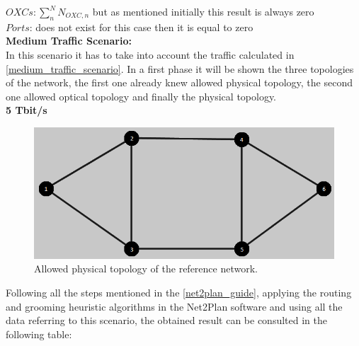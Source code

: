 \vspace{13pt}
$OXCs: \sum_n^N N_{OXC,n}$ but as mentioned initially this result is always zero \\

$Ports$: does not exist for this case then it is equal to zero \\

\newpage
\textbf{Medium Traffic Scenario:}\\

In this scenario it has to take into account the traffic calculated in \ref{medium_traffic_scenario}. In a first phase it will be shown the three topologies of the network, the first one already knew allowed physical topology, the second one allowed optical topology and finally the physical topology.\\

\textbf{5 Tbit/s}

\begin{figure}[H]
\centering
\includegraphics[width=13cm]{sdf/heuristic/figures/topological_design1}
\caption{Allowed physical topology of the reference network.}
\label{allowed_physical_surv_ref_low_heuristic}
\end{figure}

Following all the steps mentioned in the \ref{net2plan_guide}, applying the routing and grooming heuristic algorithms in the Net2Plan software and using all the data referring to this scenario, the obtained result can be consulted in the following table:

